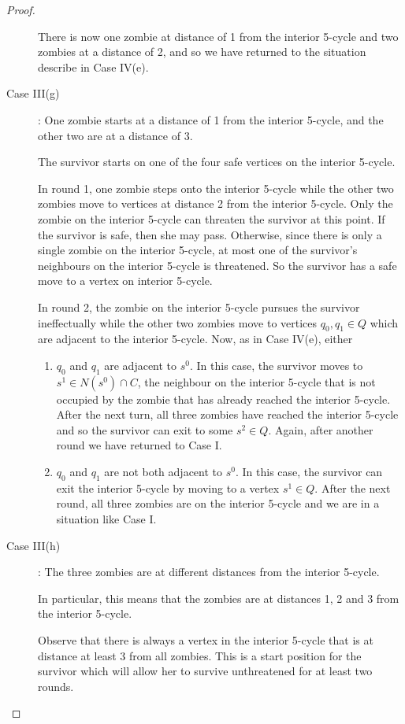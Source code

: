 \begin{proof}
\begin{description}
There is now one zombie at distance of 1 from the interior 5-cycle and two zombies at a distance of 2, and so we have returned to the situation describe in Case IV(e).

\item[Case III(g)]: One zombie starts at a distance of 1 from the interior 5-cycle, and the other two are at a distance of 3.

The survivor starts on one of the four safe vertices on the interior 5-cycle.

In round 1, one zombie steps onto the interior 5-cycle while the other two zombies move to vertices at distance 2 from the interior 5-cycle.
Only the zombie on the interior 5-cycle can threaten the survivor at this point. If the survivor is safe, then she may pass. Otherwise, since there is
only a single zombie on the interior 5-cycle, at most one of the survivor's neighbours on the interior 5-cycle is threatened.
So the survivor has a safe move to a vertex on interior 5-cycle.

In round 2, the zombie on the interior 5-cycle pursues the survivor ineffectually while the other two zombies move to vertices $q_0, q_1 \in Q$ which are
adjacent to the interior 5-cycle. Now, as in Case IV(e), either

\begin{enumerate}
\item $q_0$ and $q_1$ are adjacent to $s^0$. In this case, the survivor moves to $s^1 \in N(s^0) \cap C$, the neighbour on the interior 5-cycle that is not occupied
by the zombie that has already reached the interior 5-cycle. After the next turn, all three zombies have reached the interior 5-cycle and so the survivor can
exit to some $s^2 \in Q$. Again, after another round we have returned to Case I.

\item $q_0$ and $q_1$ are not both adjacent to $s^0$. In this case, the survivor can exit the interior 5-cycle by moving to a vertex $s^1 \in Q$. After the next
round, all three zombies are on the interior 5-cycle and we are in a situation like Case I.
\end{enumerate}


\item[Case III(h)]: The three zombies are at different distances from the interior 5-cycle.

In particular, this means that the zombies are at distances 1, 2 and 3 from the interior 5-cycle.

Observe that there is always a vertex in the interior 5-cycle that is at distance at least 3 from all zombies. This is a start position for the survivor which
will allow her to survive unthreatened for at least two rounds.


\end{description}
\end{proof}
